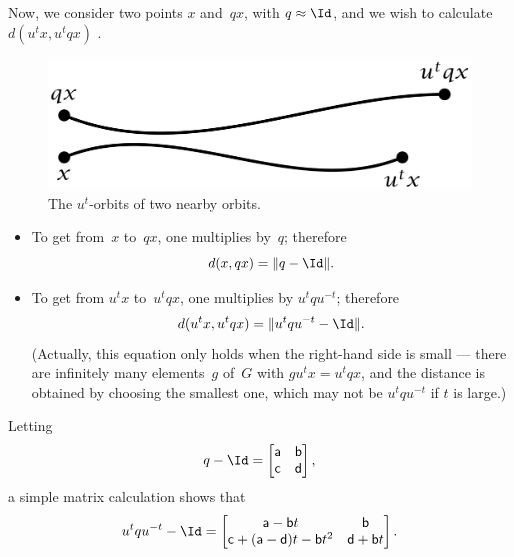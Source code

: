 Now, we consider two points $x$ and~$qx$, with $q
\approx \Id$, and we wish to calculate
 $ d( u^t x, u^t q x ) $
 . 
 \begin{figure}[ht]
 \begin{center}
 \includegraphics{PDF/movapart.jpg}
 \caption{The $u^t$-orbits of two nearby orbits.}
 \label{movapart}
 \end{center}
 \end{figure}
%
%
%
%
%
 \begin{itemize}
 \item To get from~$x$ to~$qx$, one multiplies by~$q$; therefore 
 	$$d(x,qx) = \|q - \Id \| .$$
 \item To get from $u^t x$ to~$u^t q x$, one multiplies by $u^t q u^{-t}$;
therefore 
 $$d( u^t x, u^t q x) = \|u^t q u^{-t} - \Id \| .$$
 (Actually, this equation only holds when the right-hand side is small --- there are infinitely many elements~$g$ of~$G$ with $g u^t x = u^t q x$, and the distance is obtained by choosing
the smallest one, which may not be $u^t q u^{-t}$ if $t$ is large.)
 \end{itemize}
 Letting
 $$ q - \Id = \begin{bmatrix}\mathsf{a} &\mathsf{b} \\ \mathsf{c} & \mathsf{d} \end{bmatrix}
,$$
 a simple matrix calculation shows that
 \begin{align} \label{ConjByU}
 u^t q u^{-t} - \Id = \begin{bmatrix}
 \mathsf{a} -\mathsf{b} t & \mathsf{b} \\
 \mathsf{c}  + (\mathsf{a} -\mathsf{d})t - \mathsf{b} t^2 & \mathsf{d} + \mathsf{b} t
 \end{bmatrix}
 .
  \end{align}

